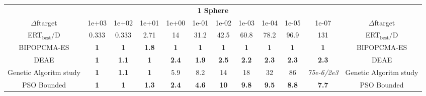 \begin{tabular}{cccccccccccc}
 & \multicolumn{10}{c}{{\normalsize \textbf{1 Sphere}}}\\
$\Delta$ftarget& 1e+03& 1e+02& 1e+01& 1e+00& 1e-01& 1e-02& 1e-03& 1e-04& 1e-05& 1e-07 & $\Delta$ftarget \\
ERT$_{\textrm{best}}$/D& 0.333& 0.333& 2.71& 14& 31.2& 42.5& 60.8& 78.2& 96.9& 131 & ERT$_{\textrm{best}}$/D \\
\hline
BIPOPCMA-ES & \textbf{1} & \textbf{1} & \textbf{1.8} & \textbf{1} & \textbf{1} & \textbf{1} & \textbf{1} & \textbf{1} & \textbf{1} & \textbf{1} & BIPOPCMA-ES \cite{add_an_entry_for_BIPOPCMA-ES_in_bbob.bib}\\
DEAE & \textbf{1} & \textbf{1.1} & \textbf{1} & \textbf{2.4} & \textbf{1.9} & \textbf{2.5} & \textbf{2.2} & \textbf{2.3} & \textbf{2.3} & \textbf{2.3} & DEAE \cite{add_an_entry_for_DEAE_in_bbob.bib}\\
Genetic Algoritm study & \textbf{1} & \textbf{1.1} & \textbf{1} & 5.9 & 8.2 & 14 & 18 & 32 & 86 & \textit{75e-6}\textit{/2e3} & Genetic Algoritm study \cite{add_an_entry_for_Genetic Algoritm study_in_bbob.bib}\\
PSO Bounded & \textbf{1} & \textbf{1} & \textbf{1.3} & \textbf{2.4} & \textbf{4.6} & \textbf{10} & \textbf{9.8} & \textbf{9.5} & \textbf{8.8} & \textbf{7.7} & PSO Bounded \cite{add_an_entry_for_PSO Bounded_in_bbob.bib}
\end{tabular}
